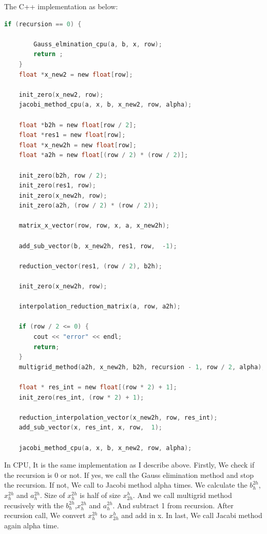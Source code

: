 The C++ implementation as below:\\
\begin{lstlisting}[language=C, caption=Multigrid method in C++]
	if (recursion == 0) {

        Gauss_elmination_cpu(a, b, x, row);
        return ;
    }
    float *x_new2 = new float[row];

    init_zero(x_new2, row);
    jacobi_method_cpu(a, x, b, x_new2, row, alpha);

    float *b2h = new float[row / 2];
    float *res1 = new float[row];
    float *x_new2h = new float[row];
    float *a2h = new float[(row / 2) * (row / 2)];

    init_zero(b2h, row / 2);
    init_zero(res1, row);
    init_zero(x_new2h, row);
    init_zero(a2h, (row / 2) * (row / 2));

    matrix_x_vector(row, row, x, a, x_new2h);

    add_sub_vector(b, x_new2h, res1, row,  -1);

    reduction_vector(res1, (row / 2), b2h);

    init_zero(x_new2h, row);

    interpolation_reduction_matrix(a, row, a2h);

    if (row / 2 <= 0) {
        cout << "error" << endl;
        return;
    }
    multigrid_method(a2h, x_new2h, b2h, recursion - 1, row / 2, alpha);

    float * res_int = new float[(row * 2) + 1];
    init_zero(res_int, (row * 2) + 1);

    reduction_interpolation_vector(x_new2h, row, res_int);
    add_sub_vector(x, res_int, x, row,  1);

    jacobi_method_cpu(a, x, b, x_new2, row, alpha);
\end{lstlisting}

In CPU, It is the same implementation as I describe above. Firstly, We check if the recursion is
0 or not. If yes, we call the Gauss elimination method and stop the recursion. If not,
We call to Jacobi method alpha times. We calculate the $b_h^{2h}$,$x_h^{2h}$  and $a_h^{2h}$. Size of $x_h^{2h}$ is half of size $x_{2h}^h$. And we call multigrid method recusively with the $b_h^{2h}$,$x_h^{2h}$  and $a_h^{2h}$. And subtract 1 from recursion. After recursion call, We convert $x_h^{2h}$ to $x_{2h}^h$ and add in x. In last, We call Jacabi method again alpha time. 


